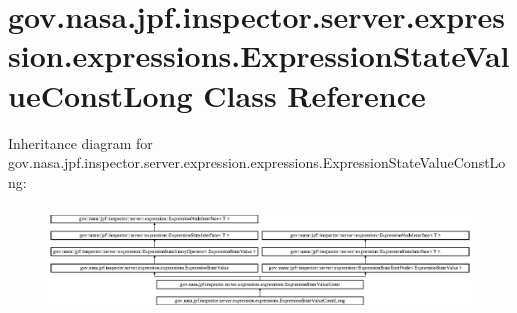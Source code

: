 \hypertarget{classgov_1_1nasa_1_1jpf_1_1inspector_1_1server_1_1expression_1_1expressions_1_1_expression_state_value_const_long}{}\section{gov.\+nasa.\+jpf.\+inspector.\+server.\+expression.\+expressions.\+Expression\+State\+Value\+Const\+Long Class Reference}
\label{classgov_1_1nasa_1_1jpf_1_1inspector_1_1server_1_1expression_1_1expressions_1_1_expression_state_value_const_long}
Inheritance diagram for gov.\+nasa.\+jpf.\+inspector.\+server.\+expression.\+expressions.\+Expression\+State\+Value\+Const\+Long\+:\begin{figure}[H]
\begin{center}
\leavevmode
\includegraphics[height=2.847458cm]{classgov_1_1nasa_1_1jpf_1_1inspector_1_1server_1_1expression_1_1expressions_1_1_expression_state_value_const_long}
\end{center}
\end{figure}
